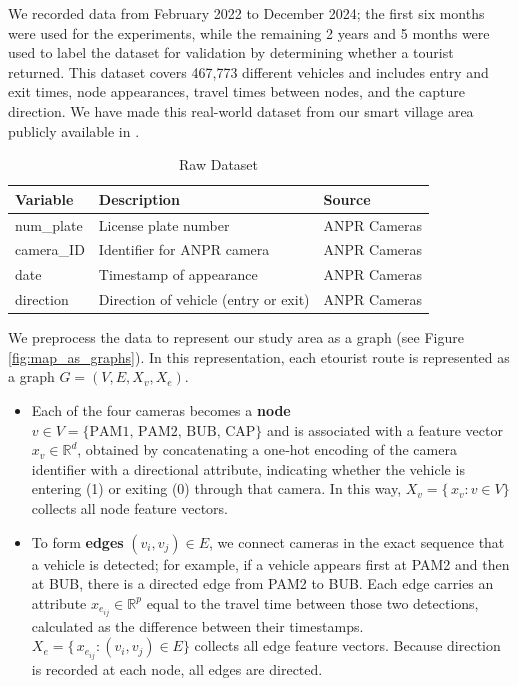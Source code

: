\documentclass[journal]{IEEEtran}
\begin{document}
We recorded data from February 2022 to December 2024; the first six months were used for the experiments, while the remaining 2 years and 5 months were used to label the dataset for validation by determining whether a tourist returned. This dataset covers 467,773 different vehicles and includes entry and exit times, node appearances, travel times between nodes, and the capture direction. We have made this real-world dataset from our smart village area publicly available in \cite{duran_lopez_2025_14993130}.

\begin{table}[htbp]
\centering
\caption{Raw Dataset}
\label{tab:raw_dataset}
\footnotesize
\begin{tabular}{lll}
\toprule
\textbf{Variable} & \textbf{Description} & \textbf{Source} \\ 
\midrule
num\_plate & License plate number & ANPR Cameras \\ 
camera\_ID & Identifier for ANPR camera & ANPR Cameras \\ 
date & Timestamp of appearance & ANPR Cameras \\ 
direction & Direction of vehicle (entry or exit) & ANPR Cameras \\ 
\bottomrule
\end{tabular}%
\end{table}




We preprocess the data to represent our study area as a graph (see Figure \ref{fig:map_as_graphs}). In this representation, each etourist route is represented as a graph $G = (V, E, X_v, X_e)$. 

\begin{itemize}
	\item Each of the four cameras becomes a \textbf{node} $v \in V = \{\text{PAM1, PAM2, BUB, CAP}\}$ and is associated with a feature vector $x_v \in \mathbb{R}^d$, obtained by concatenating a one‐hot encoding of the camera identifier with a directional attribute, indicating whether the vehicle is entering (1) or exiting (0) through that camera. In this way, $X_v = \{\,x_v : v \in V\}$ collects all node feature vectors.
	\item To form \textbf{edges} $(v_i, v_j) \in E$, we connect cameras in the exact sequence that a vehicle is detected; for example, if a vehicle appears first at PAM2 and then at BUB, there is a directed edge from PAM2 to BUB. Each edge carries an attribute $x_{e_{ij}} \in \mathbb{R}^p$ equal to the travel time between those two detections, calculated as the difference between their timestamps. $X_e = \{\,x_{e_{ij}} : (v_i, v_j) \in E\}$ collects all edge feature vectors. Because direction is recorded at each node, all edges are directed.
\end{itemize}
\end{document}
